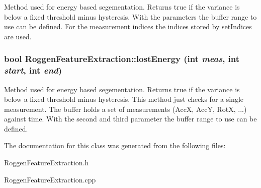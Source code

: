 Method used for energy based segementation. Returns true if the variance is below a fixed threshold minus hysteresis. With the parameters the buffer range to use can be defined. For the measurement indices the indices stored by setIndices are used. \hypertarget{classRoggenFeatureExtraction_a261efc9381862b08542148db4128df3a}{
\subsubsection[{lostEnergy}]{\setlength{\rightskip}{0pt plus 5cm}bool RoggenFeatureExtraction::lostEnergy (int {\em meas}, \/  int {\em start}, \/  int {\em end})}}
\label{classRoggenFeatureExtraction_a261efc9381862b08542148db4128df3a}
Method used for energy based segementation. Returns true if the variance is below a fixed threshold minus hysteresis. This method just checks for a single measurement. The buffer holds a set of measurements (AccX, AccY, RotX, ...) against time. With the second and third parameter the buffer range to use can be defined. 

The documentation for this class was generated from the following files:\begin{DoxyCompactItemize}
\item 
RoggenFeatureExtraction.h\item 
RoggenFeatureExtraction.cpp\end{DoxyCompactItemize}
